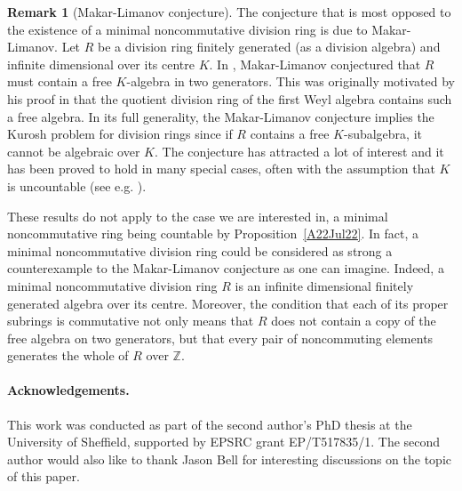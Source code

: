 \documentclass[11pt]{article}
\theoremstyle{definition}
\newtheorem{remark}[corollary]{Remark}
\begin{document}
\begin{remark}[Makar-Limanov conjecture]\label{RemarkMakar-Limanov}
The conjecture that is most opposed to the existence of a minimal noncommutative division ring is due to Makar-Limanov. Let $R$ be a division ring finitely generated (as a division algebra) and infinite dimensional over its centre $K$. In \cite[p.~284]{Makar-Limanov1984}, Makar-Limanov conjectured that $R$ must contain a free $K$-algebra in two generators. This was originally motivated by his proof in \cite{Makar-Limanov_DivisionWeyl} that the quotient division ring of the first Weyl algebra contains such a free algebra. In its full generality, the Makar-Limanov conjecture implies the Kurosh problem for division rings since if $R$ contains a free $K$-subalgebra, it cannot be algebraic over $K$. The conjecture has attracted a lot of interest and it has been proved to hold in many special cases, often with the assumption that $K$ is uncountable (see e.g. \cite{BellRogalski_FreeSubalgebrasDivision}).

These results do not apply to the case we are interested in, a minimal noncommutative ring being countable by Proposition~\ref{A22Jul22}. In fact, a minimal noncommutative division ring could be considered as strong a counterexample to the Makar-Limanov conjecture as one can imagine. Indeed, a minimal noncommutative division ring $R$ is an infinite dimensional finitely generated algebra over its centre. Moreover, the condition that each of its proper subrings is commutative not only means that $R$ does not contain a copy of the free algebra on two generators, but that every pair of noncommuting elements generates the whole of $R$ over $\mathbb{Z}$.
\end{remark}

\paragraph{Acknowledgements.} This work was conducted as part of the second author's PhD thesis at the University of Sheffield, supported by EPSRC grant EP/T517835/1. The second author would also like to thank Jason Bell for interesting discussions on the topic of this paper.
\end{document}
